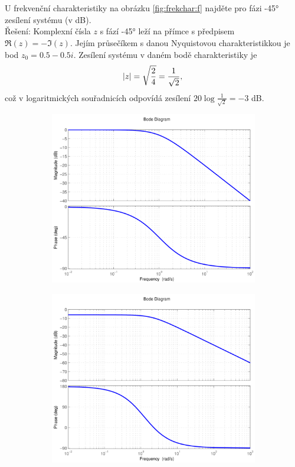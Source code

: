 \documentclass[twoside]{article}
\begin{document}
\subsection{~}
U frekvenční charakteristiky na obrázku \ref{fig:frekchar:f} najděte pro fázi -45° zesílení systému (v dB). \\
Řešení: Komplexní čísla $z$ s fází -45° leží na přímce s předpisem $ \Re(z) = - \Im(z)$. Jejím průsečíkem s danou Nyquistovou charakteristikkou
je bod $z_0 = 0.5 - 0.5i$. Zesílení systému v daném bodě charakteristiky je 
\begin{equation}
	\abs{z} = \sqrt{\frac{2}{4}} = \frac{1}{\sqrt{2}},
\end{equation}
což v logaritmických souřadnicích odpovídá zesílení $20 \log{\frac{1}{\sqrt{2}}} = -3$ dB.


\begin{figure}[htbp]
    \centering %
\begin{subfigure}{0.25\textwidth}
  \includegraphics[width=\linewidth]{zadani12-a}
  \caption{}
  \label{fig:frekchar:a}
\end{subfigure}\hfil %
\begin{subfigure}{0.25\textwidth}
	\includegraphics[width=\linewidth]{zadani12-b}

\end{subfigure}
\end{figure}
\end{document}
